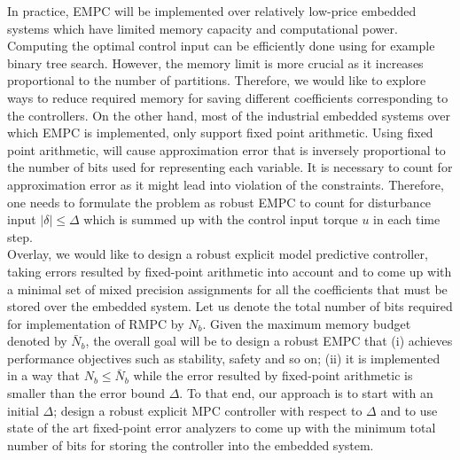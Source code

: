 	In practice, EMPC will be implemented over relatively low-price embedded systems which have limited memory capacity and computational power. Computing the optimal control input can be efficiently done using for example binary tree search. However, the memory limit is more crucial as it increases proportional to the number of partitions.	Therefore, we would like to explore ways to reduce required memory for saving different coefficients corresponding to the controllers.
	On the other hand, most of the industrial embedded systems over which EMPC is implemented, only support fixed point arithmetic. Using fixed point arithmetic, will cause approximation error that is inversely proportional to the number of bits used for representing each variable. It is necessary to count for approximation error as it might lead into violation of the constraints. Therefore, one needs to formulate the problem as robust EMPC to count for disturbance input $|\delta|\leq \Delta$ which is summed up with the control input torque $u$ in each time step.\\ %
	Overlay, we would like to design a robust explicit model predictive controller, taking errors resulted by fixed-point arithmetic into account and to come up with a minimal set of mixed precision assignments for all the coefficients that must be stored over the embedded system. Let us denote the total number of bits required for implementation of RMPC by $N_b$. Given the maximum memory budget denoted by $\bar N_b$, the overall goal will be to design a robust EMPC that (i) achieves performance objectives such as stability, safety and so on; (ii) it is implemented in a way that $N_b\leq \bar N_b$ while the error resulted by fixed-point arithmetic is smaller than the error bound $\Delta$. To that end, our approach is to start with an initial $\Delta$; design a robust explicit MPC controller with respect to $\Delta$ and to use state of the art fixed-point error analyzers to come up with the minimum total number of bits for storing the controller into the embedded system.\\
	
